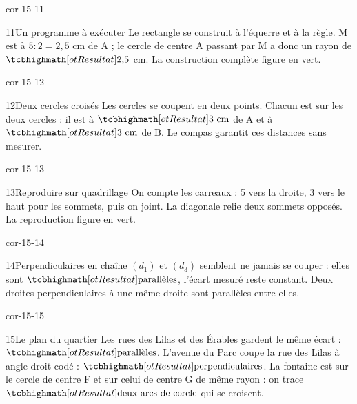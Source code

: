 \begin{blocLivre}{cor-15-11}\begin{corrige}{11}{Un programme à exécuter}
Le rectangle se construit à l’équerre et à la règle. M est à $5:2=2{,}5$ cm de A ; le cercle de centre A passant par M a donc un rayon de $\res{2{,}5}$ cm. La construction complète figure en vert.
\label{fig-cor-15-11}
\end{corrige}\end{blocLivre}
\begin{blocLivre}{cor-15-12}\begin{corrige}{12}{Deux cercles croisés}
Les cercles se coupent en deux points. Chacun est sur les deux cercles : il est à $\res{3\ \mathrm{cm}}$ de A et à $\res{3\ \mathrm{cm}}$ de B. Le compas garantit ces distances sans mesurer.
\label{fig-cor-15-12}
\end{corrige}\end{blocLivre}
\begin{blocLivre}{cor-15-13}\begin{corrige}{13}{Reproduire sur quadrillage}
On compte les carreaux : 5 vers la droite, 3 vers le haut pour les sommets, puis on joint. La diagonale relie deux sommets opposés. La reproduction figure en vert.
\label{fig-cor-15-13}
\end{corrige}\end{blocLivre}
\begin{blocLivre}{cor-15-14}\begin{corrige}{14}{Perpendiculaires en chaîne}
$(d_1)$ et $(d_3)$ semblent ne jamais se couper : elles sont $\res{\text{parallèles}}$, l’écart mesuré reste constant. Deux droites perpendiculaires à une même droite sont parallèles entre elles.
\label{fig-cor-15-14}
\end{corrige}\end{blocLivre}
\begin{blocLivre}{cor-15-15}\begin{corrige}{15}{Le plan du quartier}
Les rues des Lilas et des Érables gardent le même écart : $\res{\text{parallèles}}$. L’avenue du Parc coupe la rue des Lilas à angle droit codé : $\res{\text{perpendiculaires}}$. La fontaine est sur le cercle de centre F et sur celui de centre G de même rayon : on trace $\res{\text{deux arcs de cercle}}$ qui se croisent.
\label{fig-cor-15-15}
\end{corrige}\end{blocLivre}
